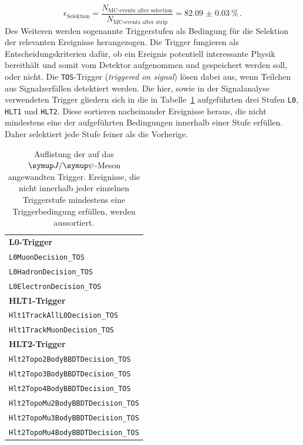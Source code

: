 %
\begin{equation}
  \epsilon_\text{Selektion}=\frac{N_\text{MC-events after selection}}{N_\text{MC-events after strip}}=\SI{82.09(3)}{\percent} \, .%
  \label{eq:eff_strip1}
\end{equation}
%
Des Weiteren werden sogenannte Triggerstufen als Bedingung für die Selektion der relevanten Ereignisse herangezogen. Die Trigger fungieren als Entscheidungskriterien dafür, ob ein Ereignis potentiell interessante Physik bereithält und somit vom Detektor aufgenommen und gespeichert werden soll, oder nicht. Die \texttt{TOS}-Trigger (\textit{triggered on signal}) lösen dabei aus, wenn Teilchen aus Signalzerfällen detektiert werden. Die hier, sowie in der Signalanalyse \cite{ba-maik} verwendeten Trigger gliedern sich in die in Tabelle~\ref{tab:trigger} aufgeführten drei Stufen \texttt{L0}, \texttt{HLT1} und \texttt{HLT2}. Diese sortieren nacheinander Ereignisse heraus, die nicht mindestens eine der aufgeführten Bedingungen innerhalb einer Stufe erfüllen. Daher selektiert jede Stufe feiner als die Vorherige.
%
\begin{table}[htb]
  \centering
  \caption{Auflistung der auf das $\jpsi$-Meson angewandten Trigger.
  Ereignisse, die nicht innerhalb jeder einzelnen Triggerstufe mindestens eine Triggerbedingung erfüllen, werden aussortiert.}
  \begin{tabular}{l}
    \toprule
    \textbf{L0-Trigger}                                 \\
    \quad\texttt{L0MuonDecision\_TOS}              \\
    \quad\texttt{L0HadronDecision\_TOS}            \\
    \quad\texttt{L0ElectronDecision\_TOS}          \\
    \midrule
    \textbf{HLT1-Trigger}                               \\
    \quad\texttt{Hlt1TrackAllL0Decision\_TOS}      \\
    \quad\texttt{Hlt1TrackMuonDecision\_TOS}       \\
    \midrule
    \textbf{HLT2-Trigger}                               \\
    \quad\texttt{Hlt2Topo2BodyBBDTDecision\_TOS}   \\
    \quad\texttt{Hlt2Topo3BodyBBDTDecision\_TOS}   \\
    \quad\texttt{Hlt2Topo4BodyBBDTDecision\_TOS}   \\
    \quad\texttt{Hlt2TopoMu2BodyBBDTDecision\_TOS} \\
    \quad\texttt{Hlt2TopoMu3BodyBBDTDecision\_TOS} \\
    \quad\texttt{Hlt2TopoMu4BodyBBDTDecision\_TOS} \\
    \bottomrule
  \end{tabular}
  \label{tab:trigger}
\end{table}
